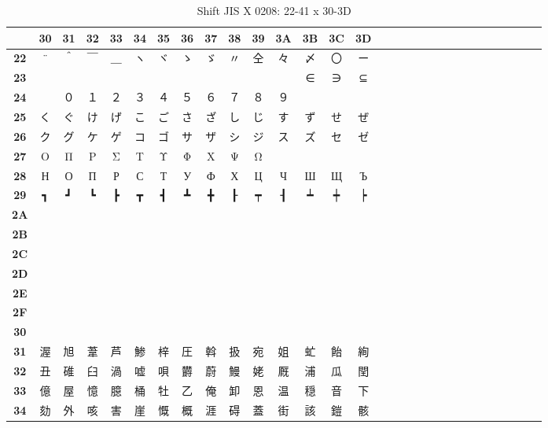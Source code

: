 \begin{table}[H]
\Fontified
\centering
\caption{Shift JIS X 0208: 22-41 x 30-3D}
\begin{tabular}{|Sc|Sc|Sc|Sc|Sc|Sc|Sc|Sc|Sc|Sc|Sc|Sc|Sc|Sc|Sc|}
\hline
 & \textbf{30} & \textbf{31} & \textbf{32} & \textbf{33} & \textbf{34} & \textbf{35} & \textbf{36} & \textbf{37} & \textbf{38} & \textbf{39} & \textbf{3A} & \textbf{3B} & \textbf{3C} & \textbf{3D} \\ \hline
\textbf{22} & ¨ & ＾ & ￣ & ＿ & ヽ & ヾ & ゝ & ゞ & 〃 & 仝 & 々 & 〆 & 〇 & ー \\ \hline
\textbf{23} &  &  &  &  &  &  &  &  &  &  &  & ∈ & ∋ & ⊆ \\ \hline
\textbf{24} &  & ０ & １ & ２ & ３ & ４ & ５ & ６ & ７ & ８ & ９ &  &  &  \\ \hline
\textbf{25} & く & ぐ & け & げ & こ & ご & さ & ざ & し & じ & す & ず & せ & ぜ \\ \hline
\textbf{26} & ク & グ & ケ & ゲ & コ & ゴ & サ & ザ & シ & ジ & ス & ズ & セ & ゼ \\ \hline
\textbf{27} & Ο & Π & Ρ & Σ & Τ & Υ & Φ & Χ & Ψ & Ω &  &  &  &  \\ \hline
\textbf{28} & Н & О & П & Р & С & Т & У & Ф & Х & Ц & Ч & Ш & Щ & Ъ \\ \hline
\textbf{29} & ┓ & ┛ & ┗ & ┣ & ┳ & ┫ & ┻ & ╋ & ┠ & ┯ & ┨ & ┷ & ┿ & ┝ \\ \hline
\textbf{2A} &  &  &  &  &  &  &  &  &  &  &  &  &  &  \\ \hline
\textbf{2B} &  &  &  &  &  &  &  &  &  &  &  &  &  &  \\ \hline
\textbf{2C} &  &  &  &  &  &  &  &  &  &  &  &  &  &  \\ \hline
\textbf{2D} &  &  &  &  &  &  &  &  &  &  &  &  &  &  \\ \hline
\textbf{2E} &  &  &  &  &  &  &  &  &  &  &  &  &  &  \\ \hline
\textbf{2F} &  &  &  &  &  &  &  &  &  &  &  &  &  &  \\ \hline
\textbf{30} &  &  &  &  &  &  &  &  &  &  &  &  &  &  \\ \hline
\textbf{31} & 渥 & 旭 & 葦 & 芦 & 鯵 & 梓 & 圧 & 斡 & 扱 & 宛 & 姐 & 虻 & 飴 & 絢 \\ \hline
\textbf{32} & 丑 & 碓 & 臼 & 渦 & 嘘 & 唄 & 欝 & 蔚 & 鰻 & 姥 & 厩 & 浦 & 瓜 & 閏 \\ \hline
\textbf{33} & 億 & 屋 & 憶 & 臆 & 桶 & 牡 & 乙 & 俺 & 卸 & 恩 & 温 & 穏 & 音 & 下 \\ \hline
\textbf{34} & 劾 & 外 & 咳 & 害 & 崖 & 慨 & 概 & 涯 & 碍 & 蓋 & 街 & 該 & 鎧 & 骸 \\ \hline

\end{tabular}
\end{table}
